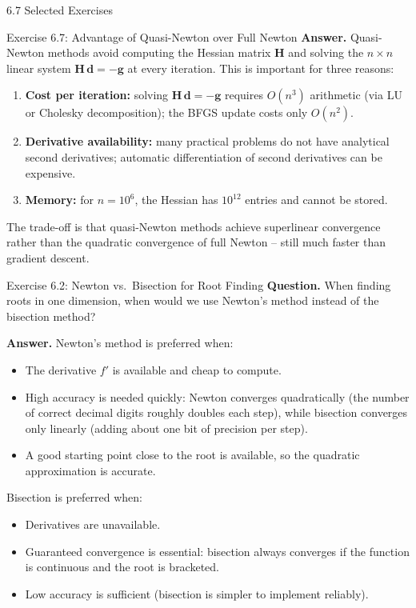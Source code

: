 \documentclass[aspectratio=169,10pt]{beamer}
\newcommand{\gbf}{\mathbf{g}}
\newcommand{\Hbf}{\mathbf{H}}
\begin{document}
\begin{frame}[allowframebreaks]{6.7 Selected Exercises}
\begin{block}{Exercise 6.7: Advantage of Quasi-Newton over Full Newton}
    \medskip
    \textbf{Answer.} Quasi-Newton methods avoid computing the Hessian matrix
    $\Hbf$ and solving the $n \times n$ linear system $\Hbf\,\mathbf{d} = -\gbf$
    at every iteration.  This is important for three reasons:
    \begin{enumerate}
      \item \textbf{Cost per iteration:} solving $\Hbf\,\mathbf{d} = -\gbf$
        requires $O(n^3)$ arithmetic (via LU or Cholesky decomposition); the BFGS
        update costs only $O(n^2)$.
      \item \textbf{Derivative availability:} many practical problems do not have
        analytical second derivatives; automatic differentiation of second
        derivatives can be expensive.
      \item \textbf{Memory:} for $n = 10^6$, the Hessian has $10^{12}$ entries and
        cannot be stored.
    \end{enumerate}
    The trade-off is that quasi-Newton methods achieve superlinear convergence
    rather than the quadratic convergence of full Newton -- still much faster than
    gradient descent.
  \end{block}

  \begin{block}{Exercise 6.2: Newton vs.\ Bisection for Root Finding}
    \textbf{Question.} When finding roots in one dimension, when would we use
    Newton's method instead of the bisection method?

    \medskip
    \textbf{Answer.} Newton's method is preferred when:
    \begin{itemize}
      \item The derivative $f'$ is available and cheap to compute.
      \item High accuracy is needed quickly: Newton converges quadratically (the
        number of correct decimal digits roughly doubles each step), while
        bisection converges only linearly (adding about one bit of precision per
        step).
      \item A good starting point close to the root is available, so the quadratic
        approximation is accurate.
    \end{itemize}
    Bisection is preferred when:
    \begin{itemize}
      \item Derivatives are unavailable.
      \item Guaranteed convergence is essential: bisection always converges if the
        function is continuous and the root is bracketed.
      \item Low accuracy is sufficient (bisection is simpler to implement
        reliably).
    \end{itemize}
  \end{block}


\end{frame}
\end{document}
